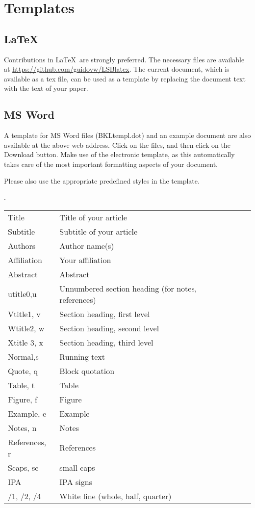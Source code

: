 \documentclass[times,linguex]{lsb}
\begin{document}
\section{Templates}

\subsection{\LaTeX\ }
Contributions in \LaTeX\ are strongly preferred. The necessary files are available at \url{https://github.com/guidovw/LSBlatex}. The current document, which is available as a tex file, can be used as a template by replacing the document text with the text of your paper.

\subsection{MS Word}

A template for MS Word files (BKLtempl.dot) and an example document are also available at the above web address. Click on the files, and then click on the Download button. Make use of the electronic template, as this automatically takes care of the most important formatting aspects of your document. 

Please also use the appropriate predefined styles in the template.

\ex. \begin{tabular}[t]{llll@{\hskip 36pt}}
Title			& Title of your article\\
Subtitle		& Subtitle of your article\\
Authors		& Author name(s)\\
Affiliation	& Your affiliation\\
Abstract	& 	Abstract\\
utitle0,u	& 	Unnumbered section heading (for notes, references)\\
Vtitle1, v	& 	Section heading, first level\\
Wtitle2, w	& 	Section heading, second level\\
Xtitle 3, x	& 	Section heading, third level\\
Normal,s & Running text \\
Quote, q	& 	Block quotation\\
Table, t	& 	Table\\
Figure, f	& 	Figure\\
Example, e	& 	Example\\
Notes, n	& 	Notes\\
References, r	& 	References\\
Scaps, sc	& 	small caps\\
IPA		& 	IPA signs \\
/1, /2, /4	& 	White line (whole, half, quarter)   \\
\end{tabular}
\end{document}
